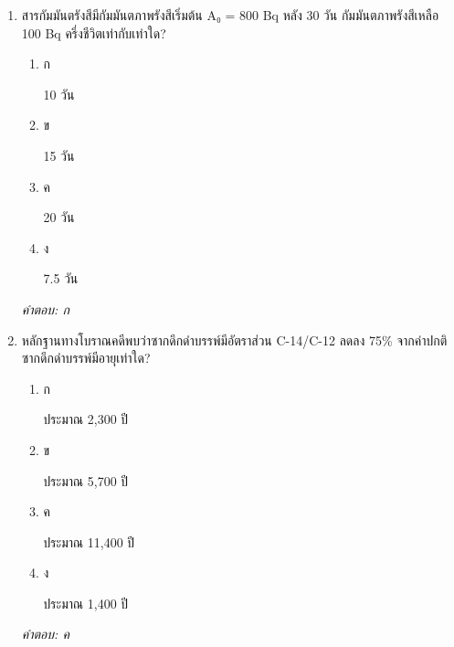 \documentclass[12pt]{article}
\begin{document}
\begin{enumerate}[label=\arabic*., itemsep=0.5\baselineskip, topsep=0.5\baselineskip, leftmargin=*]
\item สารกัมมันตรังสีมีกัมมันตภาพรังสีเริ่มต้น A₀ = 800 Bq หลัง 30 วัน กัมมันตภาพรังสีเหลือ 100 Bq ครึ่งชีวิตเท่ากับเท่าใด?
\begin{enumerate}[label=\alph*)., itemsep=0.3\baselineskip, topsep=0.3\baselineskip]
\item ก\ 
\begin{minipage}[t]{0.9\linewidth}
\raggedright 10 วัน
\end{minipage}
\item ข\ 
\begin{minipage}[t]{0.9\linewidth}
\raggedright 15 วัน
\end{minipage}
\item ค\ 
\begin{minipage}[t]{0.9\linewidth}
\raggedright 20 วัน
\end{minipage}
\item ง\ 
\begin{minipage}[t]{0.9\linewidth}
\raggedright 7.5 วัน
\end{minipage}
\end{enumerate}
\vspace{-0.3\baselineskip}
\begin{small}
\textit{คำตอบ: ก}
\end{small}

\item หลักฐานทางโบราณคดีพบว่าซากดึกดำบรรพ์มีอัตราส่วน C-14/C-12 ลดลง 75\% จากค่าปกติ ซากดึกดำบรรพ์มีอายุเท่าใด?
\begin{enumerate}[label=\alph*)., itemsep=0.3\baselineskip, topsep=0.3\baselineskip]
\item ก\ 
\begin{minipage}[t]{0.9\linewidth}
\raggedright ประมาณ 2,300 ปี
\end{minipage}
\item ข\ 
\begin{minipage}[t]{0.9\linewidth}
\raggedright ประมาณ 5,700 ปี
\end{minipage}
\item ค\ 
\begin{minipage}[t]{0.9\linewidth}
\raggedright ประมาณ 11,400 ปี
\end{minipage}
\item ง\ 
\begin{minipage}[t]{0.9\linewidth}
\raggedright ประมาณ 1,400 ปี
\end{minipage}
\end{enumerate}
\vspace{-0.3\baselineskip}
\begin{small}
\textit{คำตอบ: ค}
\end{small}


\end{enumerate}
\end{document}
